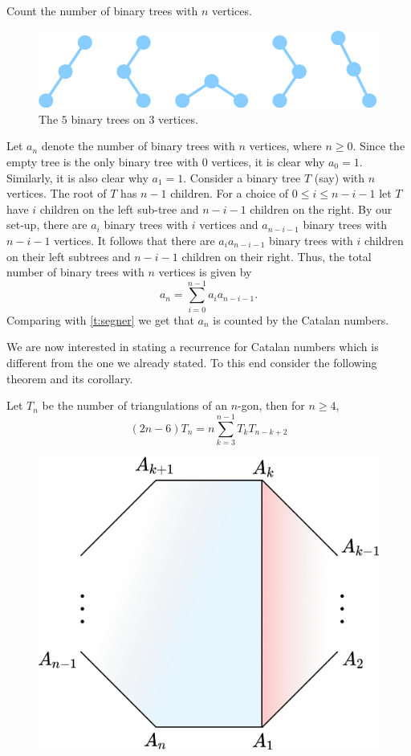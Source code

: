 \begin{question}
Count the number of binary trees with $n$ vertices.
\end{question}
\begin{figure}[H]
    \centering
    \includegraphics[width=0.7\linewidth]{Images/Figure23.png}
    \caption{The $5$ binary trees on $3$ vertices.}
\end{figure}
\begin{solution}
Let $a_n$ denote the number of binary trees with $n$ vertices, where $n\geq 0$. Since the empty tree is the only binary tree with $0$ vertices, it is clear why $a_0 = 1$. Similarly, it is also clear why $a_1=1$. Consider a binary tree $T$ (say) with $n$ vertices. The root of $T$ has $n-1$ children. For a choice of $0\leq i\leq n-i-1$ let $T$ have $i$ children on the left sub-tree and $n-i-1$ children on the right. By our set-up, there are $a_i$ binary trees with $i$ vertices and $a_{n-i-1}$ binary trees with $n-i-1$ vertices. It follows that there are $a_i a_{n-i-1}$ binary trees with $i$ children on their left subtrees and $n-i-1$ children on their right. Thus, the total number of binary trees with $n$ vertices is given by
\[
a_n = \sum_{i=0}^{n-1}a_ia_{n-i-1}.
\]
Comparing with \cref{t:segner} we get that $a_n$ is counted by the Catalan numbers. 
\end{solution}
We are now interested in stating a recurrence for Catalan numbers which is different from the one we already stated. To this end consider the following theorem and its corollary. 
\begin{theorem}
    Let $T_n$ be the number of triangulations of an $n$-gon, then for $n\geq 4$,
    \[
    (2n-6)T_n = n\sum_{k=3}^{n-1}T_kT_{n-k+2}
    \]
\end{theorem}
\begin{figure}[H]
    \centering
    \includegraphics[width=0.45\linewidth]{Images/Figure22.png}
    \caption{}
    \label{f:Segner2f}
\end{figure}
